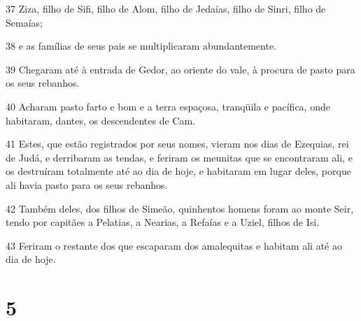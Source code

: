\par 37 Ziza, filho de Sifi, filho de Alom, filho de Jedaías, filho de Sinri, filho de Semaías;
\par 38 e as famílias de seus pais se multiplicaram abundantemente.
\par 39 Chegaram até à entrada de Gedor, ao oriente do vale, à procura de pasto para os seus rebanhos.
\par 40 Acharam pasto farto e bom e a terra espaçosa, tranqüila e pacífica, onde habitaram, dantes, os descendentes de Cam.
\par 41 Estes, que estão registrados por seus nomes, vieram nos dias de Ezequias, rei de Judá, e derribaram as tendas, e feriram os meunitas que se encontraram ali, e os destruíram totalmente até ao dia de hoje, e habitaram em lugar deles, porque ali havia pasto para os seus rebanhos.
\par 42 Também deles, dos filhos de Simeão, quinhentos homens foram ao monte Seir, tendo por capitães a Pelatias, a Nearias, a Refaías e a Uziel, filhos de Isi.
\par 43 Feriram o restante dos que escaparam dos amalequitas e habitam ali até ao dia de hoje.

\chapter{5}

